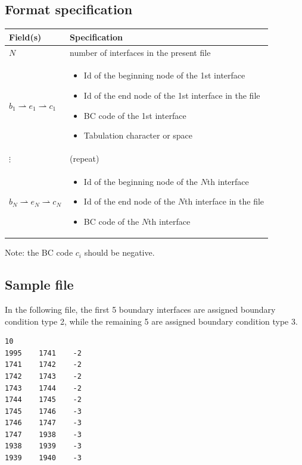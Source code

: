 \subsection{Format specification}
\begin{footnotesize}
\begin{tabular}{p{4cm} | p{10cm} }
\hline
Field(s) & Specification \\
\hline
\hline
$N$ & number of interfaces in the present file \\
\hline
$b_1 \rightharpoonup e_1 \rightharpoonup c_1$ &
\begin{itemize}
\item [$b_1$] Id of the beginning node of the 1st interface
\item [$e_1$] Id of the end node of the 1st interface in the file
\item [$c_1$] BC code of the 1st interface
\item [$\rightharpoonup$] Tabulation character or space
\end{itemize} \\
\hline
$\vdots$ & (repeat) \\
\hline
$b_N \rightharpoonup e_N \rightharpoonup c_N$ & 
\begin{itemize}
\item [$b_N$] Id of the beginning node of the $N$th interface
\item [$e_N$] Id of the end node of the $N$th interface in the file
\item [$c_N$] BC code of the $N$th interface
\end{itemize} \\
\hline
\end{tabular}
\end{footnotesize}
Note: the BC code $c_i$ should be negative.

\subsection{Sample file}
In the following file, the first 5 boundary interfaces are assigned boundary condition type 2, while the remaining 5 are assigned boundary condition type 3. 
\begin{verbatim}
10
1995	1741	-2
1741	1742	-2
1742	1743	-2
1743	1744	-2
1744	1745	-2
1745	1746	-3
1746	1747	-3
1747	1938	-3
1938	1939	-3
1939	1940	-3
\end{verbatim}


